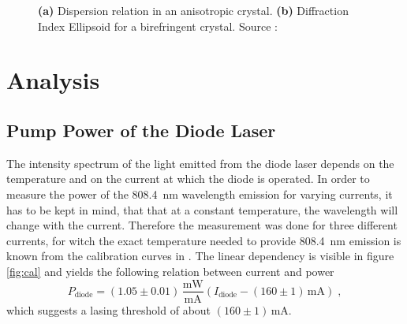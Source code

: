 \documentclass[a4paper]{scrartcl}
\numberwithin{equation}{section}
\numberwithin{figure}{section}
\numberwithin{table}{section}
\newcommand{\eq}[2]{\begin{equation}#1\label{#2}\end{equation}}
\begin{document}
\begin{figure}
\centering
{}
\hfill
{}
\caption{\small \textbf{(a)} Dispersion relation in an anisotropic crystal. \textbf{(b)} Diffraction Index Ellipsoid for a birefringent crystal. Source : \cite{dickel}}
\label{fig:nonlinearofoptics}
\end{figure}





\section{Analysis}
\subsection{Pump Power of the Diode Laser}
The intensity spectrum of the light emitted from the diode laser depends on the temperature and on the current at which the diode is operated. In order to measure the power of the \SI{808.4}{nm} wavelength emission for varying currents, it has to be kept in mind, that that at a constant temperature, the wavelength will change with the current. Therefore the measurement was done for three different currents, for witch the exact temperature needed to provide \SI{808.4}{nm} emission is known from the calibration curves in \cite{script}. The linear dependency  is visible in figure \ref{fig:cal} and yields the following relation between current and power
\eq{P_\text{diode}=(1.05\pm 0.01)\,\frac{\text{mW}}{\text{mA}}\left(I_\text{diode}-(160\pm 1)\,\text{mA} \right) \;, }{cal}
which suggests a lasing threshold of about $(160\pm 1)\,\text{mA}$. 
\end{document}
